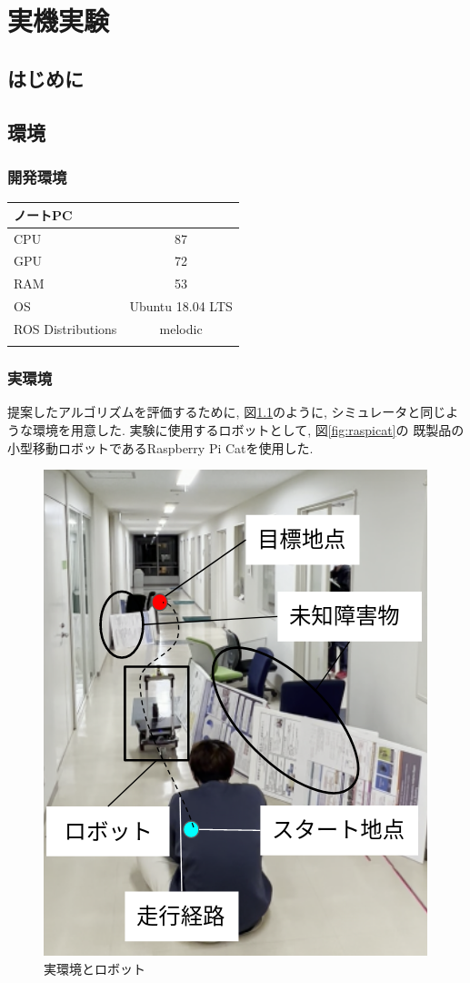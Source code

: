 \chapter{実機実験}\label{chap:practical_experiment}

\section{はじめに}

\section{環境}

\subsection{開発環境}

\begin{center}
  \begin{tabular}{l|c} 
    \thline
    ノートPC&\\
    \hline
    CPU & 87  \\
    GPU & 72   \\
    RAM & 53   \\
    OS & Ubuntu 18.04 LTS   \\
    ROS Distributions & melodic   \\ 
    \thline
  \end{tabular}
\end{center}


\subsection{実環境}

提案したアルゴリズムを評価するために, 図\ref{fig:real_environment}のように, 
シミュレータと同じような環境を用意した. 実験に使用するロボットとして, 図\ref{fig:raspicat}の
既製品の小型移動ロボットであるRaspberry Pi Catを使用した. 


\begin{figure}[H]
  \begin{center}
    \includegraphics[width=0.5\linewidth]{figs/real_environment.png}
    \caption{実環境とロボット}
    \label{fig:real_environment}
  \end{center}
\end{figure}

